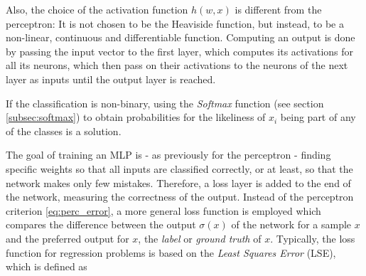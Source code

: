 \noindent Also, the choice of the activation function $h(w, x)$ is different from the perceptron: It is not chosen to be the Heaviside function, but instead, to be a non-linear, continuous and differentiable function. Computing an output is done by passing the input vector to the first layer, which computes its activations for all its neurons, which then pass on their activations to the neurons of the next layer as inputs until the output layer is reached.

If the classification is non-binary, using the \textit{Softmax} function (see section \ref{subsec:softmax}) to obtain probabilities for the likeliness of $x_i$ being part of any of the classes is a solution.\\


\noindent The goal of training an MLP is - as previously for the perceptron - finding specific weights so that all inputs are classified correctly, or at least, so that the network makes only few mistakes. Therefore, a loss layer is added to the end of the network, measuring the correctness of the output. Instead of the perceptron criterion \ref{eq:perc_error}, a more general loss function is employed which compares the difference between the output $\sigma(x)$ of the network for a sample $x$ and the preferred output for $x$, the \textit{label} or \textit{ground truth} of $x$. Typically, the loss function for regression problems is based on the \textit{Least Squares Error} (LSE), which is defined as

